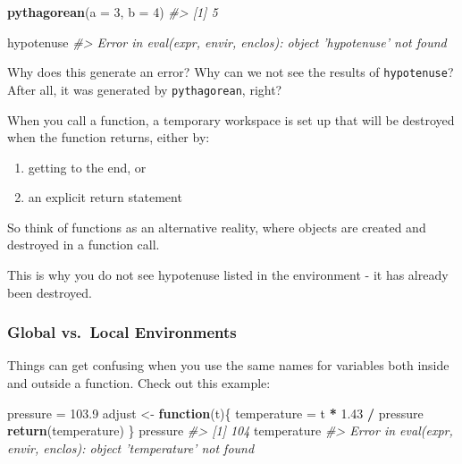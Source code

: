 \documentclass[]{book}
\newenvironment{Shaded}{\begin{snugshade}}{\end{snugshade}}
\newcommand{\KeywordTok}[1]{\textcolor[rgb]{0.13,0.29,0.53}{\textbf{#1}}}
\newcommand{\DataTypeTok}[1]{\textcolor[rgb]{0.13,0.29,0.53}{#1}}
\newcommand{\DecValTok}[1]{\textcolor[rgb]{0.00,0.00,0.81}{#1}}
\newcommand{\FloatTok}[1]{\textcolor[rgb]{0.00,0.00,0.81}{#1}}
\newcommand{\StringTok}[1]{\textcolor[rgb]{0.31,0.60,0.02}{#1}}
\newcommand{\CommentTok}[1]{\textcolor[rgb]{0.56,0.35,0.01}{\textit{#1}}}
\newcommand{\ControlFlowTok}[1]{\textcolor[rgb]{0.13,0.29,0.53}{\textbf{#1}}}
\newcommand{\OperatorTok}[1]{\textcolor[rgb]{0.81,0.36,0.00}{\textbf{#1}}}
\newcommand{\NormalTok}[1]{#1}
\providecommand{\tightlist}{%
  \setlength{\itemsep}{0pt}\setlength{\parskip}{0pt}}
\begin{document}
\begin{Shaded}
\begin{Highlighting}[]
\KeywordTok{pythagorean}\NormalTok{(}\DataTypeTok{a =} \DecValTok{3}\NormalTok{, }\DataTypeTok{b =} \DecValTok{4}\NormalTok{)}
\CommentTok{#> [1] 5}

\NormalTok{hypotenuse}
\CommentTok{#> Error in eval(expr, envir, enclos): object 'hypotenuse' not found}
\end{Highlighting}
\end{Shaded}

Why does this generate an error? Why can we not see the results of
\texttt{hypotenuse}? After all, it was generated by
\texttt{pythagorean}, right?

When you call a function, a temporary workspace is set up that will be
destroyed when the function returns, either by:

\begin{enumerate}
\def\labelenumi{\arabic{enumi}.}
\tightlist
\item
  getting to the end, or
\item
  an explicit return statement
\end{enumerate}

So think of functions as an alternative reality, where objects are
created and destroyed in a function call.

This is why you do not see hypotenuse listed in the environment - it has
already been destroyed.

\subsubsection*{Global vs.~Local
Environments}\label{global-vs.local-environments}

Things can get confusing when you use the same names for variables both
inside and outside a function. Check out this example:

\begin{Shaded}
\begin{Highlighting}[]
\NormalTok{pressure =}\StringTok{ }\FloatTok{103.9}
\NormalTok{adjust <-}\StringTok{ }\ControlFlowTok{function}\NormalTok{(t)\{}
\NormalTok{    temperature =}\StringTok{ }\NormalTok{t }\OperatorTok{*}\StringTok{ }\FloatTok{1.43} \OperatorTok{/}\StringTok{ }\NormalTok{pressure}
    \KeywordTok{return}\NormalTok{(temperature)}
\NormalTok{\}}
\NormalTok{pressure}
\CommentTok{#> [1] 104}
\NormalTok{temperature}
\CommentTok{#> Error in eval(expr, envir, enclos): object 'temperature' not found}
\end{Highlighting}
\end{Shaded}
\end{document}
